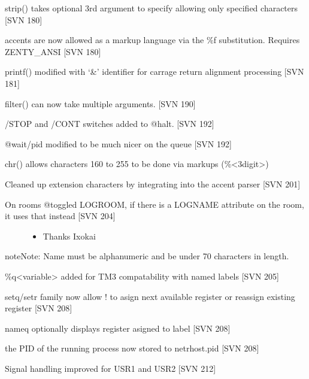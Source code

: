 \documentclass[letterpaper,10pt,english]{sphinxmanual}
\begin{document}
\sphinxAtStartPar
strip() takes optional 3rd argument to specify allowing only specified characters {[}SVN 180{]}

\sphinxAtStartPar
accents are now allowed as a markup language via the \%f substitution.  Requires ZENTY\_ANSI {[}SVN 180{]}

\sphinxAtStartPar
printf() modified with ‘\&’ identifier for carrage return alignment processing {[}SVN 181{]}

\sphinxAtStartPar
filter() can now take multiple arguments. {[}SVN 190{]}

\sphinxAtStartPar
/STOP and /CONT switches added to @halt.  {[}SVN 192{]}

\sphinxAtStartPar
@wait/pid modified to be much nicer on the queue {[}SVN 192{]}

\sphinxAtStartPar
chr() allows characters 160 to 255 to be done via markups (\%\textless{}3digit\textgreater{})

\sphinxAtStartPar
Cleaned up extension characters by integrating into the accent parser {[}SVN 201{]}
\begin{description}
\item[{On rooms @toggled LOGROOM, if there is a LOGNAME attribute on the room, it uses that instead {[}SVN 204{]}}] \leavevmode\begin{itemize}
\item {} 
\sphinxAtStartPar
Thanks Ixokai

\end{itemize}

\end{description}

\begin{sphinxadmonition}{note}{Note:}
\sphinxAtStartPar
Name must be alphanumeric and be under 70 characters in length.
\end{sphinxadmonition}

\sphinxAtStartPar
\%q\textless{}variable\textgreater{} added for TM3 compatability with named labels {[}SVN 205{]}

\sphinxAtStartPar
setq/setr family now allow ! to asign next available register or re\sphinxhyphen{}assign existing register {[}SVN 208{]}

\sphinxAtStartPar
nameq optionally displays register asigned to label {[}SVN 208{]}

\sphinxAtStartPar
the PID of the running process now stored to netrhost.pid {[}SVN 208{]}

\sphinxAtStartPar
Signal handling improved for USR1 and USR2 {[}SVN 212{]}
\end{document}
